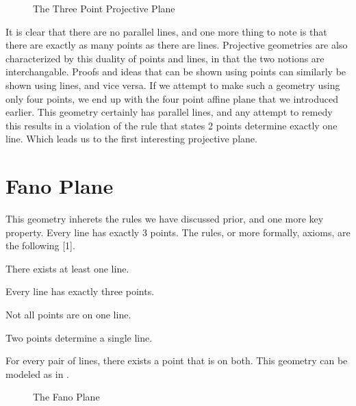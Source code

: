 \documentclass{article}
\newenvironment{axioms}
 {\enumerate[label=\textbf{A\arabic*.}, ref=A\arabic*]}
 {\endenumerate}
\begin{document}
\begin{figure}[h]
\caption{The Three Point Projective Plane}
\begin{center}
\end{center}
\end{figure}

It is clear that there are no parallel lines, and one more thing to note is that there are exactly as many points as there are lines. Projective geometries are also characterized by this duality of points and lines, in that the two notions are interchangable. Proofs and ideas that can be shown using points can similarly be shown using lines, and vice versa. If we attempt to make such a geometry using only four points, we end up with the four point affine plane that we introduced earlier. This geometry certainly has parallel lines, and any attempt to remedy this results in a violation of the rule that states 2 points determine exactly one line. Which leads us to the first interesting projective plane.

\section{Fano Plane}

This geometry inherets the rules we have discussed prior, and one more key property. Every line has exactly 3 points. The rules, or more formally, axioms, are the following [1].
\begin{axioms}
  \item There exists at least one line.
  \item Every line has exactly three points.
  \item Not all points are on one line.
  \item Two points determine a single line.
  \item For every pair of lines, there exists a point that is on both.
\end{axioms}
This geometry can be modeled as in .

\begin{figure}[h]
\begin{center}
\caption{The Fano Plane}
\end{center}
\end{figure}
\end{document}
